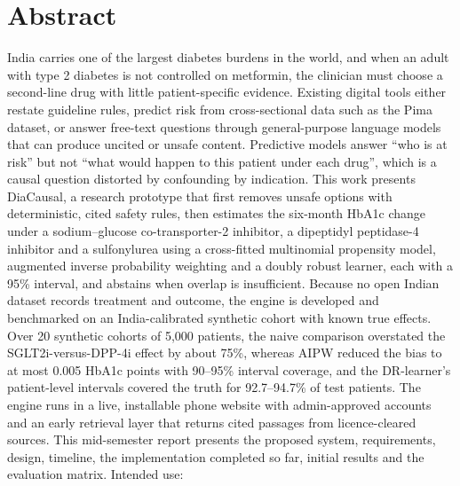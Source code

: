 \chapter*{Abstract}
\justify
India carries one of the largest diabetes burdens in the world, and when an adult with type 2 diabetes is not controlled on metformin, the clinician must choose a second-line drug with little patient-specific evidence. Existing digital tools either restate guideline rules, predict risk from cross-sectional data such as the Pima dataset, or answer free-text questions through general-purpose language models that can produce uncited or unsafe content. Predictive models answer ``who is at risk'' but not ``what would happen to this patient under each drug'', which is a causal question distorted by confounding by indication. This work presents DiaCausal, a research prototype that first removes unsafe options with deterministic, cited safety rules, then estimates the six-month HbA1c change under a sodium--glucose co-transporter-2 inhibitor, a dipeptidyl peptidase-4 inhibitor and a sulfonylurea using a cross-fitted multinomial propensity model, augmented inverse probability weighting and a doubly robust learner, each with a 95\% interval, and abstains when overlap is insufficient. Because no open Indian dataset records treatment and outcome, the engine is developed and benchmarked on an India-calibrated synthetic cohort with known true effects. Over 20 synthetic cohorts of 5{,}000 patients, the naive comparison overstated the SGLT2i-versus-DPP-4i effect by about 75\%, whereas AIPW reduced the bias to at most 0.005 HbA1c points with 90--95\% interval coverage, and the DR-learner's patient-level intervals covered the truth for 92.7--94.7\% of test patients. The engine runs in a live, installable phone website with admin-approved accounts and an early retrieval layer that returns cited passages from licence-cleared sources. This mid-semester report presents the proposed system, requirements, design, timeline, the implementation completed so far, initial results and the evaluation matrix. Intended use: \intendeduse
